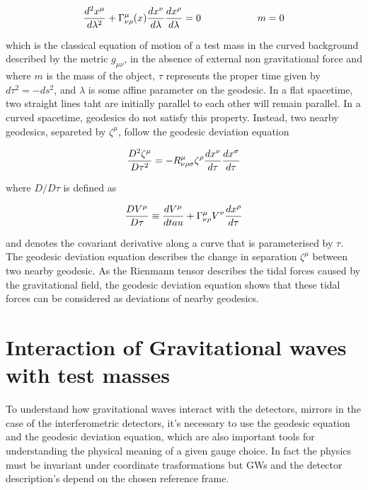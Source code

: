 \documentclass[binding=0.6cm, LaM]{sapthesis}
\begin{document}
		\begin{equation}
		{{d^2x^{\mu}}\over{d\lambda^2}} + \Gamma_{\nu\rho}^{\mu}(x){{dx^{\nu}}\over{d\lambda}}{{dx^{\rho}}\over{d\lambda}} = 0 \hspace*{2cm} m = 0
		\end{equation}

	which is the classical equation of motion of a test mass in the curved background described 
	by the metric $g_{\mu\nu}$, in the absence of external non gravitational force and where $m$ is the mass
	of the object, $\tau$ represents the proper time given by $d\tau^2 = -ds^2$, 
	and $\lambda$ is some affine parameter on the geodesic.
	In a flat spacetime, two straight lines taht are initially parallel to each other will remain parallel. 
	In a curved spacetime, geodesics do not satisfy this property.
	Instead, two nearby geodesics, separeted by $\zeta^{\mu}$, follow the geodesic deviation equation
		
		\begin{equation}
		{{D^2\zeta^{\mu}}\over{D\tau^2}} = -R^{\mu}_{\nu\rho\sigma}\zeta^{\rho}{{dx^{\nu}}\over{d\tau}}{{dx^{\sigma}}\over{d\tau}}
		\end{equation}

	where $D/D\tau$ is defined as

		\begin{equation}
		{{DV^{\mu}}\over{D\tau}} \equiv {{dV^{\mu}}\over{dtau}} + \Gamma^{\mu}_{\nu\rho}V^{\nu}{{dx^{\rho}}\over{d\tau}}
		\end{equation}

	and denotes the covariant derivative along a curve that is parameterised by $\tau$. 
	The geodesic deviation equation describes the change in separation $\zeta^{\mu}$ between two nearby geodesic.
	As the Rienmann tensor describes the tidal forces caused by the gravitational field, 
	the geodesic deviation equation shows that these tidal forces can be considered as deviations of nearby geodesics.

\section{Interaction of Gravitational waves with test masses}

	To understand how gravitational waves interact with the detectors, mirrors in the case of the interferometric detectors, 
	it's necessary to use the geodesic equation and the geodesic deviation equation, which are also important tools 
	for understanding the physical meaning of a given gauge choice.
	In fact the physics must be invariant under coordinate trasformations but GWs and the detector description's depend on the chosen reference frame.
\end{document}
